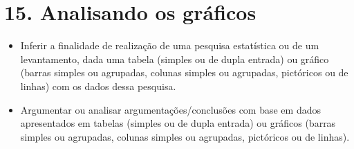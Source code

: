 
\chapter{15. Analisando os gráficos}


\begin{itemize}
\item Inferir a finalidade de realização de uma pesquisa estatística ou de
um levantamento, dada uma tabela (simples ou de dupla entrada) ou
gráfico (barras simples ou agrupadas, colunas simples ou agrupadas,
pictóricos ou de linhas) com os dados dessa pesquisa.

\item Argumentar ou analisar argumentações/conclusões com base em dados
apresentados em tabelas (simples ou de dupla entrada) ou gráficos
(barras simples ou agrupadas, colunas simples ou agrupadas, pictóricos
ou de linhas).
\end{itemize}

